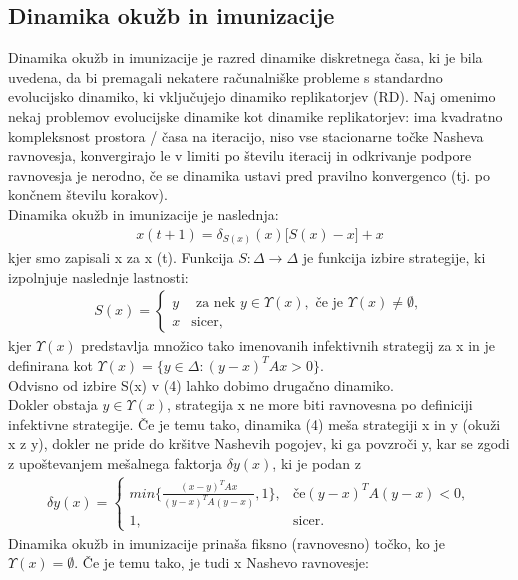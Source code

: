\documentclass[a4paper]{article}
\begin{document}
\subsection{Dinamika okužb in imunizacije}
Dinamika okužb in imunizacije je razred dinamike diskretnega časa, ki je bila uvedena, da bi premagali nekatere računalniške probleme s standardno evolucijsko dinamiko, ki vključujejo dinamiko replikatorjev (RD). Naj omenimo nekaj problemov evolucijske dinamike kot dinamike replikatorjev: ima kvadratno kompleksnost prostora / časa na iteracijo, niso vse stacionarne točke Nasheva ravnovesja, konvergirajo le v limiti po številu iteracij in odkrivanje podpore ravnovesja je nerodno, če se dinamika ustavi pred pravilno konvergenco (tj. po končnem številu korakov).\\
Dinamika okužb in imunizacije je naslednja:
\begin{gather} x(t + 1) = \delta_{S(x)}(x)\lbrack S(x) - x\rbrack + x \end{gather}
kjer smo zapisali x za x (t). Funkcija $S:\Delta\rightarrow\Delta$ je funkcija izbire strategije, ki izpolnjuje naslednje lastnosti:
\begin{gather}
S (x) = \begin{cases}
y & \text{ za nek } y \in \Upsilon (x), \text{ če je } \Upsilon (x) \not= \emptyset, \\
x & \text{sicer,} \end{cases} \end{gather}
kjer $\Upsilon(x)$ predstavlja množico tako imenovanih infektivnih strategij za x in je definirana kot $\Upsilon(x) = \{y \in\Delta : (y - x)^T A x> 0\}$.\\
Odvisno od izbire S(x) v (4) lahko dobimo drugačno dinamiko.\\
Dokler obstaja $y \in\Upsilon (x)$, strategija x ne more biti ravnovesna po definiciji infektivne strategije. Če je temu tako, dinamika (4) meša strategiji x in y (okuži x z y), dokler ne pride do kršitve Nashevih pogojev, ki ga povzroči y, kar se zgodi z upoštevanjem mešalnega faktorja $\delta y (x)$, ki je podan z
\begin{gather}
\delta y (x) =
\begin{cases}
min\{\frac{(x-y)^T A x}{(y-x)^T A (y-x)}, 1\} ,& \text{če} (y - x)^T A (y - x) <0,\\
1, & \text{sicer.}
\end{cases}
\end{gather}
Dinamika okužb in imunizacije prinaša fiksno (ravnovesno) točko, ko je $\Upsilon(x) = \emptyset$. Če je temu tako, je tudi x Nashevo ravnovesje:
\end{document}
